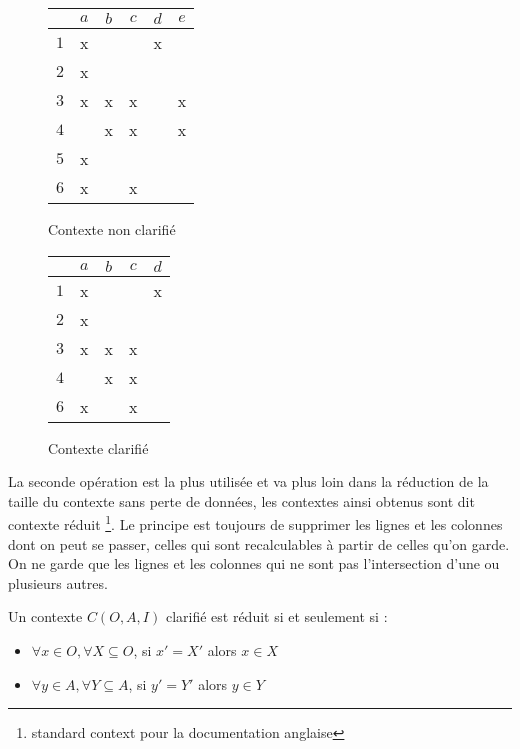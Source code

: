 \begin{figure}[H]
	\begin{minipage}[c]{0.5\textwidth}
	\begin{center}
		\begin{tabular}{ l | c c c c c }
			 & $a$ & $b$ & $c$ & $d$ & $e$ \\
			\hline
			$1$ & x & & & x & \\
			$2$ & x & & & & \\
			$3$ & x & x & x & & x \\
			$4$ & & x & x & & x \\
			$5$ & x & & & & \\
			$6$ & x & & x & & \\
		\end{tabular}
	\end{center}
	\caption{Contexte non clarifié}
	\label{def_contexte_non_clarifie}
	\end{minipage}
	\begin{minipage}[c]{0.5\textwidth}
	\begin{center}
		\begin{tabular}{ l | c c c c }
			 & $a$ & $b$ & $c$ & $d$ \\
			\hline
			$1$ & x & & & x \\
			$2$ & x & & & \\
			$3$ & x & x & x & \\
			$4$ & & x & x & \\
			$6$ & x & & x & \\
		\end{tabular}
	\end{center}
	\caption{Contexte clarifié}
	\label{def_contexte_clarifie}
	\end{minipage}
\end{figure}

La seconde opération est la plus utilisée et va plus loin dans la réduction de la taille du contexte sans perte de données, les contextes ainsi obtenus sont dit \guillemotleft{} contexte réduit \guillemotright \footnote{\guillemotleft{} standard context \guillemotright{} pour la documentation anglaise}. Le principe est toujours de supprimer les lignes et les colonnes dont on peut se passer, celles qui sont recalculables à partir de celles qu'on garde. On ne garde que les lignes et les colonnes qui ne sont pas l'intersection d'une ou plusieurs autres.

\begin{definition}
Un contexte $C(O, A, I)$ clarifié est réduit si et seulement si :
\begin{itemize}
	\item $\forall x \in O, \forall X \subseteq O$, si $x' = X'$ alors $x \in X$
	\item $\forall y \in A, \forall Y \subseteq A$, si $y' = Y'$ alors $y \in Y$
\end{itemize}
\end{definition}

